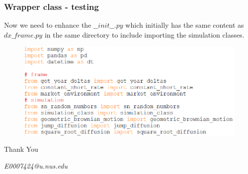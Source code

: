 \documentclass{beamer}
\begin{document}
\begin{frame}
\frametitle{Wrapper class - testing}
Now we need to enhance the $\_\_init\_\_.py$ which initially has the same content as $dx\_frame.py$ in the same directory to include importing the simulation classes.
\begin{figure}[H]
	\includegraphics[scale=0.48]{import_wrapper_class.png}
\end{figure}
\end{frame}

\begin{frame}
\Huge{\centerline{Thank You}}
\begin{center}
\begin{normalsize}
\emph{E0007424@u.nus.edu}
\end{normalsize}
\end{center}
\end{frame}

\end{document}
